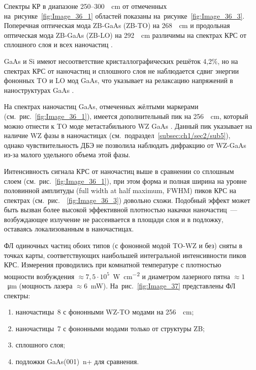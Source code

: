 Спектры КР в диапазоне 250--300~\si{\per\centi\metre} от отмеченных
на~рисунке~\cref{fig:Image_36_1} областей показаны
на~рисунке~\cref{fig:Image_36_3}. Поперечная оптическая мода ZB-GaAs (ZB-TO) на
268~\si{\per\centi\metre} и продольная оптическая мода ZB-GaAs (ZB-LO) на
292~\si{\per\centi\metre} различимы на спектрах КРС от сплошного слоя и всех
наночастиц \cite{Signorello2014}.

GaAs и Si имеют несоответствие кристаллографических решёток 4,2\%, но на
спектрах КРС от наночастиц и сплошного слоя не наблюдается сдвиг энергии
фононных TO и LO мод GaAs, что указывает на релаксацию напряжений в
наноструктурах GaAs \cite{Alekseev2017}.

На спектрах наночастиц GaAs, отмеченных жёлтыми маркерами
(см.~рис.~\cref{fig:Image_36_1}), имеется дополнительный пик на
256~\si{\per\centi\metre}, который можно отнести к TO моде метастабильного WZ
GaAs \cite{Fu2004}. Данный пик указывает на наличие WZ фазы в наночастицах
(см.~подраздел~\cref{subsec:ch1/sec2/sub5}), однако чувствительность ДБЭ не
позволила наблюдать дифракцию от WZ-GaAs из-за малого удельного объема этой
фазы.

Интенсивность сигнала КРС от наночастиц выше в сравнении со сплошным слоем
(см.~рис.~\cref{fig:Image_36_1}), при этом форма и полная ширина на уровне
половинной амплитуды (full width at half maximum, FWHM) пиков КРС на спектрах
(см.~рис.~~\cref{fig:Image_36_3}) довольно схожи. Подобный эффект может быть
вызван более высокой эффективной плотностью накачки наночастиц~--- возбуждающее
излучение не рассеивается в площади слоя и в подложку, оставаясь локализованным
в наночастицах.

ФЛ одиночных частиц обоих типов (с фононной модой TO-WZ и без) сняты в точках
карты, соответствующих наибольшей интегральной интенсивности пиков КРС.
Измерения проводились при комнатной температуре с плотностью мощности
возбуждения \(\approx 7,5 \cdot 10^5\)~\si{\watt\per\centi\metre\squared} и
диаметром лазерного пятна \(\approx 1\)~\si{\micro\metre} (мощность лазера
\(\approx 6\)~\si{\milli\watt}). На~рис.~\cref{fig:Image_37} представлены ФЛ
спектры: \begin{enumerate}[beginpenalty=10000] \item наночастицы~8 с фононными
	WZ-TO модами на 256~\si{\per\centi\metre}; \item наночастицы~7 с фононными
	модами только от структуры ZB; \item сплошного слоя; \item подложки
	GaAs(001)~n+ для сравнения.  \end{enumerate}

